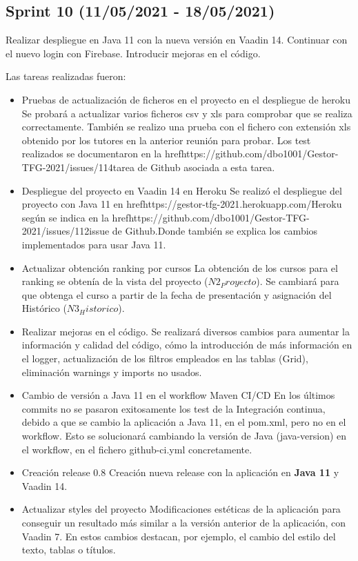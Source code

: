 

\subsection{Sprint 10 (11/05/2021 - 18/05/2021)}
Realizar despliegue en Java 11 con la nueva versión en Vaadin 14. Continuar con el nuevo login con Firebase. Introducir mejoras en el código.

Las tareas realizadas fueron:
\begin{itemize}
	\tightlist
	\item Pruebas de actualización de ficheros en el proyecto en el despliegue de heroku 
		Se probará a actualizar varios ficheros csv y xls para comprobar que se realiza correctamente. También se realizo una prueba con el fichero con extensión xls obtenido por los tutores en la anterior reunión para probar. Los test realizados se documentaron en la href{https://github.com/dbo1001/Gestor-TFG-2021/issues/114}{tarea de Github} asociada a esta tarea.
	\item Despliegue del proyecto en Vaadin 14 en Heroku 
		Se realizó el despliegue del proyecto con Java 11 en href{https://gestor-tfg-2021.herokuapp.com/}{Heroku} según se indica en la href{https://github.com/dbo1001/Gestor-TFG-2021/issues/112}{issue de Github}.Donde también se explica los cambios implementados para usar Java 11.
	\item Actualizar obtención ranking por cursos
		La obtención de los cursos para el ranking se obtenía de la vista del proyecto ($N2_Proyecto$). Se cambiará para que obtenga el curso a partir de la fecha de presentación y asignación del Histórico ($N3_Historico$).
	\item Realizar mejoras en el código.
		Se realizará diversos cambios para aumentar la información y calidad del código, cómo la introducción de más información en el logger, actualización de los filtros empleados en las tablas (Grid), eliminación warnings y imports no usados.
	\item Cambio de versión a Java 11 en el workflow Maven CI/CD
		En los últimos commits no se pasaron exitosamente los test de la Integración continua, debido a que se cambio la aplicación a Java 11, en el pom.xml, pero no en el workflow. Esto se solucionará cambiando la versión de Java (java-version) en el workflow, en el fichero github-ci.yml concretamente.
	\item Creación release 0.8
		Creación nueva release con la aplicación en \textbf{Java 11} y Vaadin 14.
	\item Actualizar styles del proyecto
		Modificaciones estéticas de la aplicación para conseguir un resultado más similar a la versión anterior de la aplicación, con Vaadin 7. En estos cambios destacan, por ejemplo, el cambio del estilo del texto, tablas o títulos.
	
\end{itemize}

